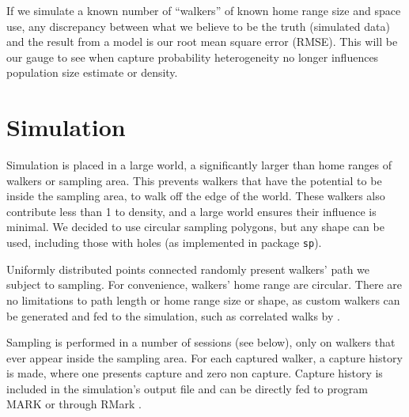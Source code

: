 \documentclass[a4paper]{article}
\begin{document}
   If we simulate a known number of ``walkers'' of known home range size and space use, any discrepancy between what we believe to be the truth (simulated data) and the result from a model is our root mean square error (RMSE). This will be our gauge to see when capture probability heterogeneity no longer influences population size estimate or density.
   
   
   
   \section{Simulation}
   
   Simulation is placed in a large world, a significantly larger than home ranges of walkers or sampling area. This prevents walkers that have the potential to be inside the sampling area, to walk off the edge of the world. These walkers also contribute less than 1 to density, and a large world ensures their influence is minimal. We decided to use circular sampling polygons, but any shape can be used, including those with holes (as implemented in package \texttt{sp}). 
   
   Uniformly distributed points connected randomly present walkers' path we subject to sampling. For convenience, walkers' home range are circular. There are no limitations to path length or home range size or shape, as custom walkers can be generated and fed to the simulation, such as correlated walks by \citet{kareiva1983}.
   
   Sampling is performed in a number of sessions (see below), only on walkers that ever appear inside the sampling area. For each captured walker, a capture history is made, where one presents capture and zero non capture. Capture history is included in the simulation's output file and can be directly fed to program MARK \citep{white1999} or through RMark \citep{rmark}.
\end{document}
